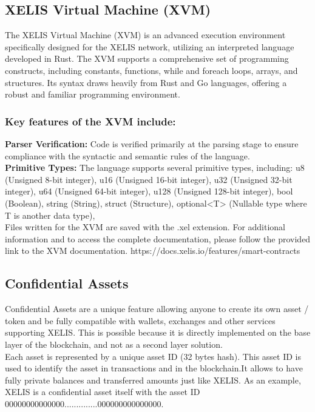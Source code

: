\documentclass[10pt,a4paper,twocolumn]{article}
\begin{document}
\subsection{XELIS Virtual Machine (XVM)}

The XELIS Virtual Machine (XVM) is an advanced execution environment specifically designed for the XELIS network, utilizing an interpreted language developed in Rust. The XVM supports a comprehensive set of programming constructs, including constants, functions, while and foreach loops, arrays, and structures. Its syntax draws heavily from Rust and Go languages, offering a robust and familiar programming environment.\\

\subsubsection{Key features of the XVM include:}

\textbf{Parser Verification:} Code is verified primarily at the parsing stage to ensure compliance with the syntactic and semantic rules of the language.\\

\textbf{Primitive Types:} The language supports several primitive types, including:
u8 (Unsigned 8-bit integer),
u16 (Unsigned 16-bit integer),
u32 (Unsigned 32-bit integer),
u64 (Unsigned 64-bit integer),
u128 (Unsigned 128-bit integer),
bool (Boolean),
string (String),
struct (Structure),
optional<T> (Nullable type where T is another data type),\\

Files written for the XVM are saved with the .xel extension. For additional information and to access the complete documentation, please follow the provided link to the XVM documentation. https://docs.xelis.io/features/smart-contracts 

\subsection{Confidential Assets}

Confidential Assets are a unique feature allowing anyone to create its own asset / token and be fully compatible with wallets, exchanges and other services supporting XELIS. This is possible because it is directly implemented on the base layer of the blockchain, and not as a second layer solution.\\

Each asset is represented by a unique asset ID (32 bytes hash). This asset ID is used to identify the asset in transactions and in the blockchain.It allows to have fully private balances and transferred amounts just like XELIS. As an example, XELIS is a confidential asset itself with the asset ID 00000000000000..............000000000000000.\\
\end{document}
